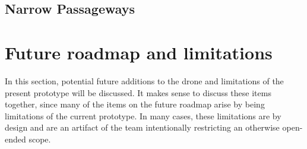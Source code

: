 \documentclass[capstone_report.tex]{subfiles}
\begin{document}
\subsection{Narrow Passageways}

\section{Future roadmap and limitations}
In this section, potential future additions to the drone and limitations of the present prototype will be discussed.  It makes sense to discuss these items together, since many of the items on the future roadmap arise by being limitations of the current prototype. In many cases, these limitations are by design and are an artifact of the team intentionally restricting an otherwise open-ended scope. \\
\end{document}
